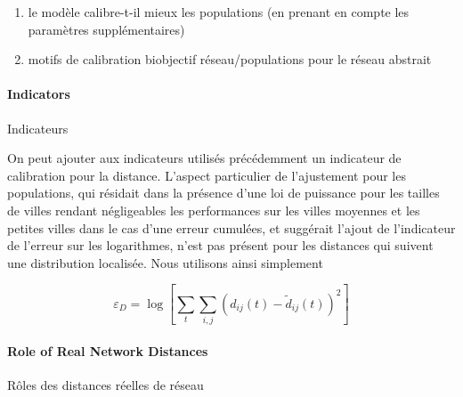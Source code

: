 \begin{enumerate}
\item le modèle calibre-t-il mieux les populations (en prenant en compte les paramètres supplémentaires)
\item motifs de calibration biobjectif réseau/populations pour le réseau abstrait
\end{enumerate}



\paragraph{Indicators}{Indicateurs}

On peut ajouter aux indicateurs utilisés précédemment un indicateur de calibration pour la distance. L'aspect particulier de l'ajustement pour les populations, qui résidait dans la présence d'une loi de puissance pour les tailles de villes rendant négligeables les performances sur les villes moyennes et les petites villes dans le cas d'une erreur cumulées, et suggérait l'ajout de l'indicateur de l'erreur sur les logarithmes, n'est pas présent pour les distances qui suivent une distribution localisée. Nous utilisons ainsi simplement

\[
\varepsilon_D = \log \left[ \sum_t \sum_{i,j} \left(d_{ij}(t) - \tilde{d}_{ij}(t)\right)^2\right]
\]


\paragraph{Role of Real Network Distances}{Rôles des distances réelles de réseau}







